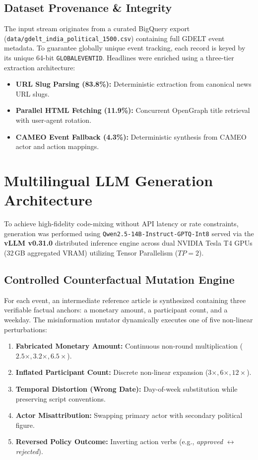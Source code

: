\documentclass[11pt,a4paper]{article}
\begin{document}
\subsection{Dataset Provenance \& Integrity}
The input stream originates from a curated BigQuery export (\texttt{data/gdelt\_india\_political\_1500.csv}) containing full GDELT event metadata. To guarantee globally unique event tracking, each record is keyed by its unique 64-bit \texttt{GLOBALEVENTID}. Headlines were enriched using a three-tier extraction architecture:
\begin{itemize}[noitemsep]
    \item \textbf{URL Slug Parsing (83.8\%):} Deterministic extraction from canonical news URL slugs.
    \item \textbf{Parallel HTML Fetching (11.9\%):} Concurrent OpenGraph title retrieval with user-agent rotation.
    \item \textbf{CAMEO Event Fallback (4.3\%):} Deterministic synthesis from CAMEO actor and action mappings.
\end{itemize}

\section{Multilingual LLM Generation Architecture}
To achieve high-fidelity code-mixing without API latency or rate constraints, generation was performed using \texttt{Qwen2.5-14B-Instruct-GPTQ-Int8} served via the \textbf{vLLM v0.31.0} distributed inference engine across dual NVIDIA Tesla T4 GPUs (32\,GB aggregated VRAM) utilizing Tensor Parallelism ($TP = 2$).

\subsection{Controlled Counterfactual Mutation Engine}
For each event, an intermediate reference article is synthesized containing three verifiable factual anchors: a monetary amount, a participant count, and a weekday. The misinformation mutator dynamically executes one of five non-linear perturbations:
\begin{enumerate}[noitemsep]
    \item \textbf{Fabricated Monetary Amount:} Continuous non-round multiplication ($2.5\times, 3.2\times, 6.5\times$).
    \item \textbf{Inflated Participant Count:} Discrete non-linear expansion ($3\times, 6\times, 12\times$).
    \item \textbf{Temporal Distortion (Wrong Date):} Day-of-week substitution while preserving script conventions.
    \item \textbf{Actor Misattribution:} Swapping primary actor with secondary political figure.
    \item \textbf{Reversed Policy Outcome:} Inverting action verbs (e.g., \textit{approved} $\leftrightarrow$ \textit{rejected}).
\end{enumerate}
\end{document}
